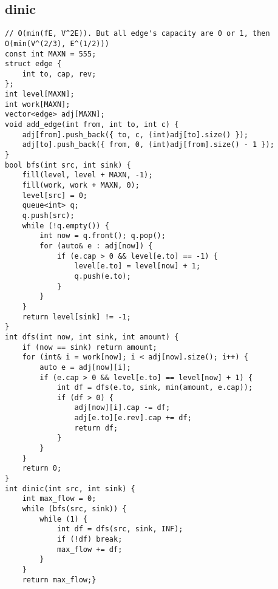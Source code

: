 \documentclass[landscape, 8pt, a4paper, oneside, twocolumn]{extarticle}
\begin{document}
\subsection {dinic}
\begin{verbatim}
// O(min(fE, V^2E)). But all edge's capacity are 0 or 1, then O(min(V^(2/3), E^(1/2)))
const int MAXN = 555;
struct edge {
    int to, cap, rev;
};
int level[MAXN];
int work[MAXN];
vector<edge> adj[MAXN];
void add_edge(int from, int to, int c) {
    adj[from].push_back({ to, c, (int)adj[to].size() });
    adj[to].push_back({ from, 0, (int)adj[from].size() - 1 });
}
bool bfs(int src, int sink) {
    fill(level, level + MAXN, -1);
    fill(work, work + MAXN, 0);
    level[src] = 0;
    queue<int> q;
    q.push(src);
    while (!q.empty()) {
        int now = q.front(); q.pop();
        for (auto& e : adj[now]) {
            if (e.cap > 0 && level[e.to] == -1) {
                level[e.to] = level[now] + 1;
                q.push(e.to);
            }
        }
    }
    return level[sink] != -1;
}
int dfs(int now, int sink, int amount) {
    if (now == sink) return amount;
    for (int& i = work[now]; i < adj[now].size(); i++) {
        auto e = adj[now][i];
        if (e.cap > 0 && level[e.to] == level[now] + 1) {
            int df = dfs(e.to, sink, min(amount, e.cap));
            if (df > 0) {
                adj[now][i].cap -= df;
                adj[e.to][e.rev].cap += df;
                return df;
            }
        }
    }
    return 0;
}
int dinic(int src, int sink) {
    int max_flow = 0;
    while (bfs(src, sink)) {
        while (1) {
            int df = dfs(src, sink, INF);
            if (!df) break;
            max_flow += df;
        }
    }
    return max_flow;}
\end{verbatim}
\newpage
\end{document}
